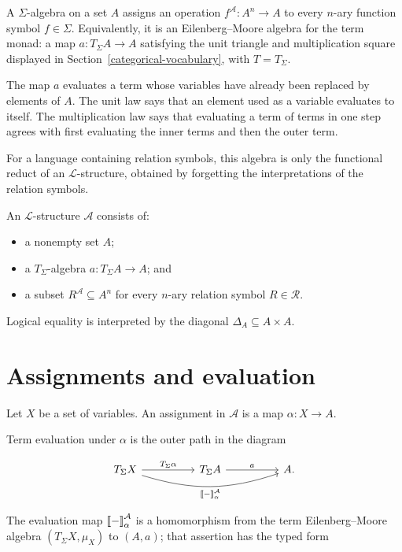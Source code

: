 \documentclass[11pt]{article}
\newcommand{\llbracket}{\mathopen{[\mkern-3mu[}}
\newcommand{\rrbracket}{\mathclose{]\mkern-3mu]}}
\newcommand{\tightlist}{\setlength{\itemsep}{0pt}%
  \setlength{\parskip}{0pt}}
\theoremstyle{definition}
\begin{document}
A \(\Sigma\)-algebra on a set \(A\) assigns an operation
\(f^{\mathcal A}:A^n\to A\) to every \(n\)-ary function symbol
\(f\in\Sigma\). Equivalently, it is an Eilenberg--Moore algebra for the
term monad: a map \(a:T_\Sigma A\to A\) satisfying the unit triangle and
multiplication square displayed in Section~\ref{categorical-vocabulary}, with
\(T=T_\Sigma\).

The map \(a\) evaluates a term whose variables have already been
replaced by elements of \(A\). The unit law says that an element used as
a variable evaluates to itself. The multiplication law says that
evaluating a term of terms in one step agrees with first evaluating the
inner terms and then the outer term.

For a language containing relation symbols, this algebra is only the
functional reduct of an \(\mathcal L\)-structure, obtained by forgetting
the interpretations of the relation symbols.

An
\(\mathcal L\)-structure \(\mathcal A\) consists of:

\begin{itemize}
\tightlist
\item
  a nonempty set \(A\);
\item
  a \(T_\Sigma\)-algebra \(a:T_\Sigma A\to A\); and
\item
  a subset \(R^{\mathcal A}\subseteq A^n\) for every \(n\)-ary relation
  symbol \(R\in\mathcal R\).
\end{itemize}

Logical equality is interpreted by the diagonal
\(\Delta_A\subseteq A\times A\).

\section{Assignments and
evaluation}\label{assignments-and-evaluation}

Let \(X\) be a set of variables. An assignment in \(\mathcal A\) is a map
\(\alpha:X\to A\).

Term evaluation under \(\alpha\) is the outer path in the diagram

\[
\begin{tikzcd}[column sep=huge]
T_\Sigma X \arrow[r,"T_\Sigma\alpha"]
  \arrow[rr,bend right=18,"\llbracket-\rrbracket^{\mathcal A}_\alpha"'] &
T_\Sigma A \arrow[r,"a"] & A.
\end{tikzcd}
\]

The evaluation map \(\llbracket-\rrbracket^{\mathcal A}_\alpha\) is a
homomorphism from the term Eilenberg--Moore algebra
\((T_\Sigma X,\mu_X)\) to \((A,a)\); that assertion has the typed form
\end{document}
